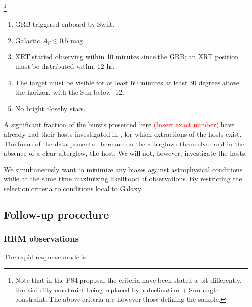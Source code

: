 \documentclass{aa}    %
\newcommand\todo[1]{\textcolor{red}{(#1)}}
\begin{document}
\footnote{Note that in the P84 proposal the criteria have
been stated a bit differently, the visibility constraint being replaced by a
declination + Sun angle constraint. The above criteria are however those
defining the sample.}

\begin{enumerate}
	\item GRB triggered onboard by Swift.
	\item Galactic $A_V \lesssim 0.5$ mag.
	\item XRT started observing within 10 minutes since the GRB; an XRT position must be distributed within 12 hr.
	\item The target must be visible for at least 60 minutes at least 30 degrees above the horizon, with the Sun below -12.
	\item No bright closeby stars.
	
\end{enumerate}


A significant fraction of the bursts presented here \todo{Insert exact
number} have already had their hosts investigated in \citet{Kruhler2015}, for
which extractions of the hosts exist. The focus of the data presented here are
on the afterglows themselves and in the absence of a clear afterglow, the host.
We will not, however, investigate the hosts.

We simultaneously want to minimize any biases against astrophysical conditions
while at the same time maximizing likelihood of observations. By restricting
the selection criteria to conditions local to Galaxy.

\subsection{Follow-up procedure}





\subsubsection{RRM observations} \label{RRM}
The rapid-response mode is 


\end{document}

